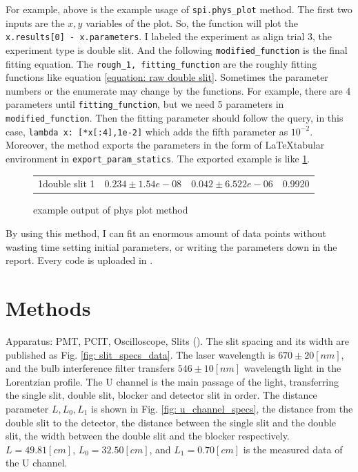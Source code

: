 \documentclass{article}
\begin{document}
 For example, above is the example usage of \verb|spi.phys_plot| method.
 The first two inputs are the $x, y$ variables of the plot.
 So, the function will plot the \verb|x.results[0] - x.parameters|.
 I labeled the experiment as align trial 3, the experiment type is double slit.
 And the following \verb|modified_function| is the final fitting equation.
 The \verb|rough_1, fitting_function| are the roughly fitting functions like equation \ref{equation: raw double slit}.
 Sometimes the parameter numbers or the enumerate may change by the functions.
 For example, there are 4 parameters until \verb|fitting_function|, but we need 5 parameters in \verb|modified_function|.
 Then the fitting parameter should follow the query, in this case, \verb|lambda x: [*x[:4],1e-2]| which adds the fifth parameter as $10^{-2}$.
 Moreover, the method exports the parameters in the form of \LaTeX tabular environment in \verb|export_param_statics|.
 The exported example is like \ref{fig: tabular example}.

 \begin{figure}[H]
    \centering
    \begin{tabular}{c|c|c|c}
        \centering
        & & &  \\ \hline 
        1double slit 1& $0.234\pm 1.54e-08$& $0.042\pm 6.522e-06$& 0.9920
    \end{tabular}
    \caption{example output of phys plot method}
    \label{fig: tabular example}
\end{figure}
By using this method, I can fit an enormous amount of data points without wasting time setting initial parameters, or writing the parameters down in the report.
Every code is uploaded in \cite{github}.

\section{Methods}
\label{methods: start}
Apparatus: PMT, PCIT, Oscilloscope, Slits (\cite{spi_spec}).
The slit spacing and its width are published as Fig. \ref{fig: slit_specs_data}.
The laser wavelength is $670 \pm 20 [nm]$, and the bulb interference filter transfers $546 \pm 10 [nm]$ wavelength light in the Lorentzian profile.
The U channel is the main passage of the light, transferring the single slit, double slit, blocker and detector slit in order.
The distance parameter $L, L_0, L_1$ is shown in Fig. \ref{fig: u_channel_specs}, the distance from the double slit to the detector, the distance between the single slit and the double slit, the width between the double slit and the blocker respectively.
$L = 49.81 [cm]$, $L_0 = 32.50 [cm]$, and $L_1 = 0.70 [cm]$ is the measured data of the U channel.
\end{document}
